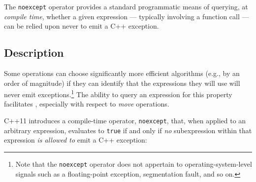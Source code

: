 

\label{asking-if-an-expression-cannot-throw-(noexcept-operator)}
\setcounter{table}{0}
\setcounter{footnote}{0}
\setcounter{lstlisting}{0}




The \lstinline!noexcept! operator provides a standard programmatic means of
querying, at \emph{compile time}, whether a given expression ---
typically involving a function call --- can be relied upon never to emit
a C++ exception.

\subsection[Description]{Description}\label{description}

Some operations can choose significantly more efficient algorithms
(e.g., by an order of magnitude) if they can identify that the
expressions they will use will never emit
exceptions.{\cprotect\footnote{Note that the \lstinline!noexcept! operator
does not appertain to operating-system-level signals such as a
  floating-point exception, segmentation fault, and so on.}} The ability
to query an expression for this property facilitates , especially with respect to \emph{move} operations.

C++11 introduces a compile-time operator, \lstinline!noexcept!, that, when
applied to an arbitrary expression, evaluates to \lstinline!true! if and
only if \emph{no}  subexpression within that
expression \emph{is allowed to} emit a C++ exception:

